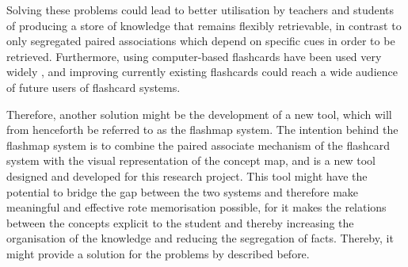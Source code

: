 \documentclass[11pt,twoside]{report} %
\begin{document}

Solving these problems could lead to better utilisation by teachers and students of producing a store of knowledge that remains flexibly retrievable, in contrast to only segregated paired associations which depend on specific cues in order to be retrieved. Furthermore, using computer-based flashcards have been used very widely \cite{nakata,burgess, golding,kornell}, and improving currently existing flashcards could reach a wide audience of future users of flashcard systems.






Therefore, another solution might be the development of a new tool, which will from henceforth be referred to as the flashmap system. The intention behind the flashmap system is to combine the paired associate mechanism of the flashcard system with the visual representation of the concept map, and is a new tool designed and developed for this research project. This tool might have the potential to bridge the gap between the two systems and therefore make meaningful and effective rote memorisation possible, for it makes the relations between the concepts explicit to the student and thereby increasing the organisation of the knowledge and reducing the segregation of facts. Thereby, it might provide a solution for the problems by  described before.
\end{document}

